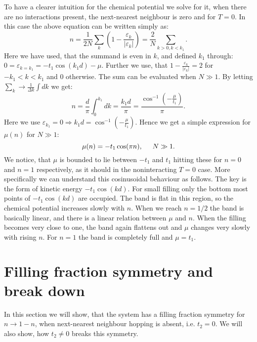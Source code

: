 To have a clearer intuition for the chemical potential we solve for it, when there are no interactions present, the next-nearest neighbour is zero and for $T = 0$. In this case the above equation can be written simply as:
\begin{equation}
n = \frac{1}{2N}\sum_k \left( 1 - \frac{\varepsilon_k}{|\varepsilon_k|}\right) = \frac{2}{N}\sum_{k > 0, k < k_1}. \nonumber
\end{equation}
Here we have used, that the summand is even in $k$, and defined $k_1$ through: $0 = \varepsilon_{k = k_1} = -t_1\cos(k_1d) - \mu$. Further we use, that $1 - \frac{\varepsilon_k}{|\varepsilon_k|} = 2$ for $-k_1 < k < k_1$ and $0$ otherwise. The sum can be evaluated when $N \gg 1$. By letting $\sum_k \to \frac{1}{\Delta k}\int dk$ we get:
\begin{equation}
n = \frac{d}{\pi}\int_0^{k_1} dk =  \frac{k_1d}{\pi} = \frac{\cos^{-1}\left(-\frac{\mu}{t_1}\right)}{\pi}. \nonumber
\end{equation}
Here we use $\varepsilon_{k_1} = 0 \Rightarrow k_1d = \cos^{-1}\left(-\frac{\mu}{t_1}\right)$. Hence we get a simple expression for $\mu(n)$ for $N\gg 1$:
\begin{equation}
\mu(n) = -t_1\cos(\pi n), \hspace{0.5cm} N\gg 1.
\label{eq.mun.T0.G0.lattice}
\end{equation}
We notice, that $\mu$ is bounded to lie between $-t_1$ and $t_1$ hitting these for $n = 0$ and $n = 1$ respectively, as it should in the noninteracting $T = 0$ case. More specifically we can understand this cosinusoidal behaviour as follows. The key is the form of kinetic energy $-t_1\cos(kd)$. For small filling only the bottom most points of $-t_1\cos(kd)$ are occupied. The band is flat in this region, so the chemical potential increases slowly with $n$. When we reach $n = 1/2$ the band is basically linear, and there is a linear relation between $\mu$ and $n$. When the filling becomes very close to one, the band again flattens out and $\mu$ changes very slowly with rising $n$. For $n = 1$ the band is completely full and $\mu = t_1$. 

\section{Filling fraction symmetry and break down}
\label{sec.fillingfractionsymmetry.breakdown}
In this section we will show, that the system has a filling fraction symmetry for $n \to 1 - n$, when next-nearest neighbour hopping is absent, i.e. $t_2 = 0$. We will also show, how $t_2 \neq 0$ breaks this symmetry. 

